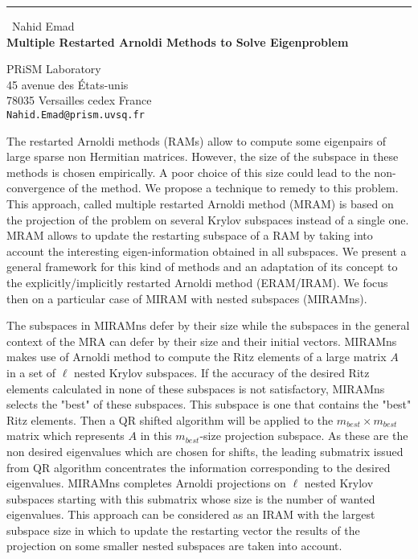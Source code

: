 \documentclass{report}
\begin{document}
\begin{center}
\rule{6in}{1pt} \
{\large Nahid Emad \\
{\bf Multiple Restarted Arnoldi Methods to Solve Eigenproblem}}

PRiSM Laboratory \\ 45 avenue des \'Etats-unis \\ 78035 Versailles cedex France
\\
{\tt Nahid.Emad@prism.uvsq.fr}\end{center}

The restarted Arnoldi methods (RAMs) allow to compute some
eigenpairs of large sparse non Hermitian matrices. However, the size
of the subspace in these methods is chosen empirically. A poor
choice of this size could lead to the non-convergence of the method.
We propose a technique to remedy to this problem. This approach,
called multiple restarted Arnoldi method (MRAM) is based on the
projection of the problem on several Krylov subspaces instead of a
single one. MRAM allows to update the restarting subspace of a RAM
by taking into account the interesting eigen-information obtained in
all subspaces. We present a general framework for this kind of
methods and an adaptation of its concept to the
explicitly/implicitly restarted Arnoldi method (ERAM/IRAM). We focus
then on a particular case of MIRAM with nested subspaces (MIRAMns).

The subspaces in MIRAMns defer by their size while the subspaces in
the general context of the MRA can defer by their size and their
initial vectors. MIRAMns makes use of Arnoldi method to compute the
Ritz elements of a large matrix $A$ in a set of $\ell$ nested Krylov
subspaces. If the accuracy of the desired Ritz elements calculated
in none of these subspaces is not satisfactory, MIRAMns selects the
"best" of these subspaces. This subspace is one that contains the
"best" Ritz elements. Then a QR shifted algorithm will be applied to
the $m_{best}\times m_{best}$ matrix which represents $A$ in this
$m_{best}$-size projection subspace. As these are the non desired
eigenvalues which are chosen for shifts, the leading submatrix
issued from QR algorithm concentrates the information corresponding
to the desired eigenvalues. MIRAMns completes Arnoldi projections on
$\ell$ nested Krylov subspaces starting with this submatrix whose
size is the number of wanted eigenvalues. This approach can be
considered as an IRAM with the largest subspace size in which to
update the restarting vector the results of the projection on some
smaller nested subspaces are taken into account.
\end{document}
